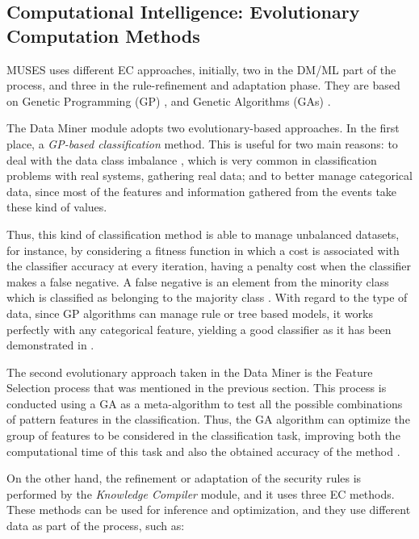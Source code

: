 
%
\subsection{Computational Intelligence: Evolutionary Computation Methods}
\label{subsec:ci}


MUSES uses different EC approaches, initially, two in the DM/ML part of the process, and three in the rule-refinement and adaptation phase. They are based on Genetic Programming (GP) \cite{GP_Koza92}, and Genetic Algorithms (GAs) \cite{GAs_Goldberg89}.

The Data Miner module adopts two evolutionary-based approaches. In the first place, a \textit{GP-based classification} method. This is useful for two main reasons: to deal with the data class imbalance \cite{imbalance_techniques_02}, which is very common in classification problems with real systems, gathering real data; and to better manage categorical data, since most of the features and information gathered from the events take these kind of values.

Thus, this kind of classification method is able to manage unbalanced datasets, for instance, by considering a fitness function in which a cost is associated with the classifier accuracy at every iteration, having a penalty cost when the classifier makes a false negative. A false negative is an element from the minority class which is classified as belonging to the majority class \cite{cost_adjustment_07}.
With regard to the type of data, since GP algorithms can manage rule or tree based models, it works perfectly with any categorical feature, yielding a good classifier as it has been demonstrated in \cite{cost_adjustment_07}.

The second evolutionary approach taken in the Data Miner is the Feature Selection process that was mentioned in the previous section. This process is conducted using a GA as a meta-algorithm to test all the possible combinations of pattern features in the classification. Thus, the GA algorithm can optimize the group of features to be considered in the classification task, improving both the computational time of this task and also the obtained accuracy of the method \cite{liu1998feature}.

On the other hand, the refinement or adaptation of the security rules is performed by the \textit{Knowledge Compiler} module, and it uses three EC methods. These methods can be used for inference and optimization, and they use different data as part of the process, such as:

